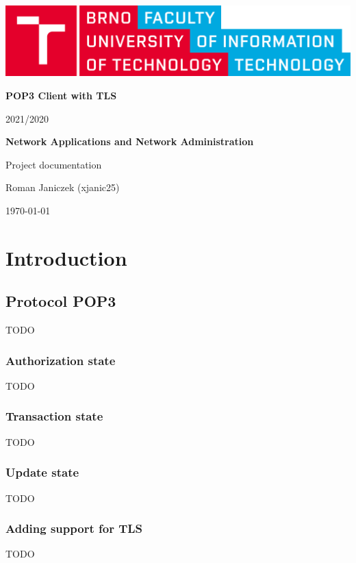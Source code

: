 \documentclass{article}
\begin{document}
\begin{titlepage}
\centering
\includegraphics[scale=0.1,keepaspectratio]{img/logo_en.png}
\vspace{5cm}

{\textbf{\Huge POP3 Client with TLS}}

\vspace{0.25cm}
{\LARGE 2021/2020}
\vspace{1cm}

{\textbf{\LARGE Network Applications and Network Administration}}
\vspace{0.25cm}


{\LARGE Project documentation}
\vspace{1cm}

{\Large Roman Janiczek (xjanic25)}

\vspace{1cm}
{\large \today}

\end{titlepage}

\newpage

\tableofcontents

\newpage

\section{Introduction}


\newpage

\subsection{Protocol POP3}
TODO
\subsubsection{Authorization state}
TODO
\subsubsection{Transaction state}
TODO
\subsubsection{Update state}
TODO
\subsubsection{Adding support for TLS}
TODO
\end{document}
